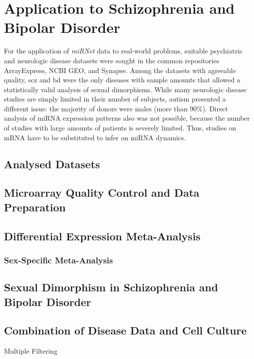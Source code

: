\section{Application to Schizophrenia and Bipolar Disorder}
For the application of \emph{miRNet} data to real-world problems, suitable psychiatric and neurologic disease datasets were sought in the common repositories ArrayExpress, NCBI GEO, and Synapse. Among the datasets with agreeable quality, \ac{scz} and \ac{bd} were the only diseases with sample amounts that allowed a statistically valid analysis of sexual dimorphisms. While many neurologic disease studies are simply limited in their number of subjects, autism presented a different issue: the majority of donors were males (more than 90\%). Direct analysis of miRNA expression patterns also was not possible, because the number of studies with large amounts of patients is severely limited. Thus, studies on mRNA have to be substituted to infer on miRNA dynamics.

\begin{method}

\subsection{Analysed Datasets}

\subsection{Microarray Quality Control and Data Preparation}

\subsection{Differential Expression Meta-Analysis}

\subsubsection{Sex-Specific Meta-Analysis}

\end{method}

\subsection{Sexual Dimorphism in Schizophrenia and Bipolar Disorder}

\subsection{Combination of Disease Data and Cell Culture}
Multiple Filtering


